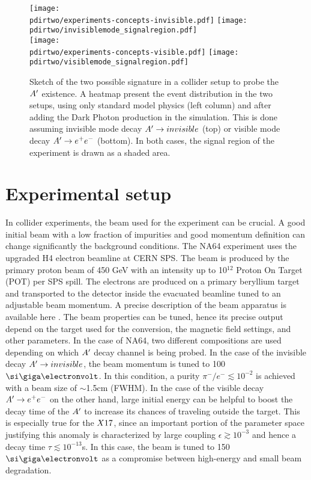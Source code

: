 \begin{figure}[bth!]
  \centering
  \texttt{[image: \\pdirtwo/experiments-concepts-invisible.pdf]}
  \texttt{[image: \\pdirtwo/invisiblemode\_signalregion.pdf]} \\
  \texttt{[image: \\pdirtwo/experiments-concepts-visible.pdf]}
  \texttt{[image: \\pdirtwo/visiblemode\_signalregion.pdf]}   
\caption[Sketch of experimental signatures for $\DM$]{Sketch of the two possible signature in a collider setup to probe the $\DM$ existence. A heatmap present the event distribution in the two setups, using only standard model physics (left column) and after adding the Dark Photon production in the simulation. This is done assuming invisible mode decay $A'\to invisible$ (top) or visible mode decay $A' \to e^+e^-$ (bottom). In both cases, the signal region of the experiment is drawn as a shaded area.}
\label{fig:two-signature}
\end{figure}

\clearpage
\newpage

\section{Experimental setup}
\label{ch2:sec:experimental-setup}

In collider experiments, the beam used for the experiment can be crucial. A good initial beam with a low fraction of impurities and good momentum definition can change significantly the background conditions. The NA64 experiment uses the upgraded H4 electron beamline at CERN SPS. The beam is produced by the primary proton beam of 450 \si{\giga\electronvolt} with an intensity up to 10$^{12}$ Proton On Target (POT) per SPS spill. The electrons are produced on a primary beryllium target and transported to the detector inside the evacuated beamline tuned to an adjustable beam momentum. A precise description of the beam apparatus is available here \cite{sps-beamline,h4-beamline}. The beam properties can be tuned, hence its precise output depend on the target used for the conversion, the magnetic field settings, and other parameters. In the case of NA64, two different compositions are used depending on which $\DM$ decay channel is being probed. In the case of the invisible decay $A'\to invisible$, the beam momentum is tuned to 100 $\gev$. In this condition, a purity $\pi^-/e^- \lesssim 10^{-2}$ is achieved with a beam size of $\sim$1.5\si{cm} (FWHM). In the case of the visible decay $A' \to e^+e^-$ on the other hand, large initial energy can be helpful to boost the decay time of the $\DM$ to increase its chances of traveling outside the target. This is especially true for the $X17$, since an important portion of the parameter space justifying this anomaly is characterized by large coupling $\epsilon \gtrsim 10^{-3}$ and hence a decay time $\tau \lesssim 10^{-13}$\si{s}. In this case, the beam is tuned to 150 $\gev$ as a compromise between high-energy and small beam degradation.


